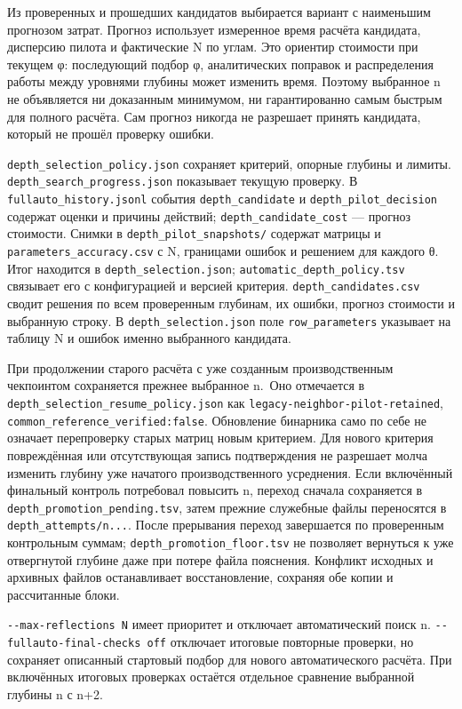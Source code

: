 Из проверенных и прошедших кандидатов выбирается вариант с наименьшим
прогнозом затрат. Прогноз использует измеренное время расчёта кандидата,
дисперсию пилота и фактические N по углам. Это ориентир стоимости при
текущем φ: последующий подбор φ, аналитических поправок и распределения
работы между уровнями глубины может изменить время. Поэтому выбранное n
не объявляется ни доказанным минимумом, ни гарантированно самым быстрым
для полного расчёта. Сам прогноз никогда не разрешает принять кандидата,
который не прошёл проверку ошибки.

\nolinkurl{depth_selection_policy.json} сохраняет критерий, опорные
глубины и лимиты. \nolinkurl{depth_search_progress.json} показывает
текущую проверку. В \nolinkurl{fullauto_history.jsonl} события
\nolinkurl{depth_candidate} и \nolinkurl{depth_pilot_decision} содержат
оценки и причины действий; \nolinkurl{depth_candidate_cost} --- прогноз
стоимости. Снимки в \nolinkurl{depth_pilot_snapshots/} содержат матрицы и
\nolinkurl{parameters_accuracy.csv} с N, границами ошибок и решением для
каждого θ. Итог находится в \nolinkurl{depth_selection.json};
\nolinkurl{automatic_depth_policy.tsv} связывает его с конфигурацией и
версией критерия. \nolinkurl{depth_candidates.csv} сводит решения по всем
проверенным глубинам, их ошибки, прогноз стоимости и выбранную строку. В
\nolinkurl{depth_selection.json} поле \nolinkurl{row_parameters} указывает
на таблицу N и ошибок именно выбранного кандидата.

При продолжении старого расчёта с уже созданным производственным
чекпоинтом сохраняется прежнее выбранное n.~Оно отмечается в
\nolinkurl{depth_selection_resume_policy.json} как
\texttt{legacy-neighbor-pilot-retained},
\nolinkurl{common_reference_verified:false}. Обновление бинарника само по
себе не означает перепроверку старых матриц новым критерием. Для нового
критерия повреждённая или отсутствующая запись подтверждения не
разрешает молча изменить глубину уже начатого производственного
усреднения. Если включённый финальный контроль потребовал повысить n,
переход сначала сохраняется в \nolinkurl{depth_promotion_pending.tsv},
затем прежние служебные файлы переносятся в
\nolinkurl{depth_attempts/n...}. После прерывания переход завершается по
проверенным контрольным суммам; \nolinkurl{depth_promotion_floor.tsv} не
позволяет вернуться к уже отвергнутой глубине даже при потере файла
пояснения. Конфликт исходных и архивных файлов останавливает
восстановление, сохраняя обе копии и рассчитанные блоки.

\texttt{-\/-max-reflections\ N} имеет приоритет и отключает
автоматический поиск n. \texttt{-\/-fullauto-final-checks\ off}
отключает итоговые повторные проверки, но сохраняет описанный стартовый
подбор для нового автоматического расчёта. При включённых итоговых
проверках остаётся отдельное сравнение выбранной глубины n с n+2.

